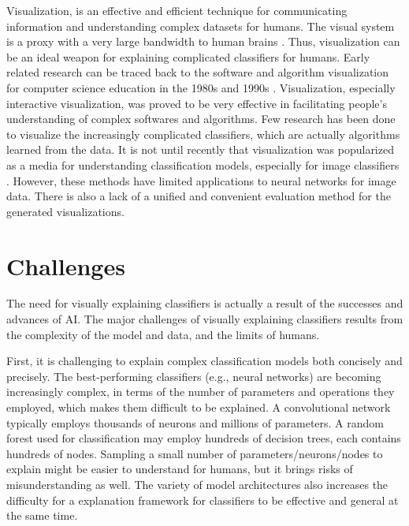 Visualization, is an effective and efficient technique for communicating information and understanding complex datasets for humans. The visual system is a proxy with a very large bandwidth to human brains \cite{munzner2014visualization}. Thus, visualization can be an ideal weapon for explaining complicated classifiers for humans. Early related research can be traced back to the software and algorithm visualization for computer science education in the 1980s and 1990s \cite{brown1987aa,stasko1990aa,price1992taxonomy}. Visualization, especially interactive visualization, was proved to be very effective in facilitating people's understanding of complex softwares and algorithms.
Few research has been done to visualize the increasingly complicated classifiers, which are actually algorithms learned from the data. It is not until recently that visualization was popularized as a media for understanding classification models, especially for image classifiers \cite{simonyan14saliency,zeiler2014eccv,bach15plos,zintgraf17visualize}. However, these methods have limited applications to neural networks for image data. There is also a lack of a unified and convenient evaluation method for the generated visualizations. 

\section{Challenges}

The need for visually explaining classifiers is actually a result of the successes and advances of AI. The major challenges of visually explaining classifiers results from the complexity of the model and data, and the limits of humans.

First, it is challenging to explain complex classification models both concisely and precisely. The best-performing classifiers (e.g., neural networks) are becoming increasingly complex, in terms of the number of parameters and operations they employed, which makes them difficult to be explained. A convolutional network typically employs thousands of neurons and millions of parameters. A random forest used for classification may employ hundreds of decision trees, each contains hundreds of nodes. Sampling a small number of parameters/neurons/nodes to explain might be easier to understand for humans, but it brings risks of misunderstanding as well. The variety of model architectures also increases the difficulty for a explanation framework for classifiers to be effective and general at the same time. 

